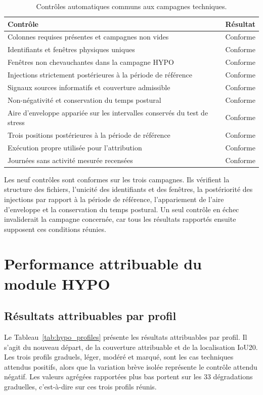 \begin{table}[H]
  \centering
  \caption{Contrôles automatiques communs aux campagnes techniques.}
  \label{tab:protocol_checks}
  \begin{tabular}{p{}c}
    \toprule
    Contrôle & Résultat \\
    \midrule
    Colonnes requises présentes et campagnes non vides & Conforme \\
    Identifiants et fenêtres physiques uniques & Conforme \\
    Fenêtres non chevauchantes dans la campagne HYPO & Conforme \\
    Injections strictement postérieures à la période de référence & Conforme \\
    Signaux sources informatifs et couverture admissible & Conforme \\
    Non-négativité et conservation du temps postural & Conforme \\
    Aire d'enveloppe appariée sur les intervalles conservés du test de stress & Conforme \\
    Trois positions postérieures à la période de référence & Conforme \\
    Exécution propre utilisée pour l'attribution & Conforme \\
    Journées sans activité mesurée recensées & Conforme \\
    \bottomrule
  \end{tabular}
\end{table}

Les neuf contrôles sont conformes sur les trois campagnes. Ils vérifient la structure des
fichiers, l'unicité des identifiants et des fenêtres, la postériorité des injections par
rapport à la période de référence, l'appariement de l'aire d'enveloppe et la conservation du
temps postural. Un seul contrôle en échec invaliderait la campagne concernée, car tous les
résultats rapportés ensuite supposent ces conditions réunies.

\section{Performance attribuable du module HYPO}
\subsection{Résultats attribuables par profil}
Le Tableau~\ref{tab:hypo_profiles} présente les résultats attribuables par profil. Il
s'agit du nouveau départ, de la couverture attribuable et de la localisation IoU20. Les trois
profils graduels, léger, modéré et marqué, sont les cas techniques attendus positifs, alors
que la variation brève isolée représente le contrôle attendu négatif. Les valeurs agrégées
rapportées plus bas portent sur les 33 dégradations graduelles, c'est-à-dire sur ces trois
profils réunis.

